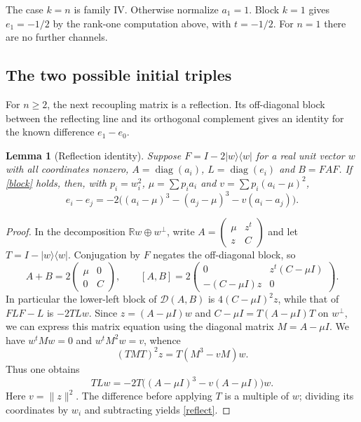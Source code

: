\documentclass[11pt]{article}
\newtheorem{lemma}[theorem]{Lemma}
\newcommand{\DD}{\mathcal D}
\newcommand{\pr}[1]{|#1\rangle\langle#1|}
\DeclareMathOperator{\diag}{diag}
\begin{document}
The case $k=n$ is family IV. Otherwise normalize $a_1=1$. Block $k=1$ gives $e_1=-1/2$ by the rank-one computation above, with $t=-1/2$. For $n=1$ there are no further channels.

\subsection{The two possible initial triples}
For $n\ge2$, the next recoupling matrix is a reflection. Its off-diagonal block between the reflecting line and its orthogonal complement gives an identity for the known difference $e_1-e_0$.

\begin{lemma}[Reflection identity]\label{reflection}
Suppose $F=I-2\pr{w}$ for a real unit vector $w$ with all coordinates nonzero, $A=\diag(a_i)$, $L=\diag(e_i)$ and $B=FAF$. If \eqref{block} holds, then, with $p_i=w_i^2$, $\mu=\sum p_i a_i$ and $v=\sum p_i(a_i-\mu)^2$,
\begin{equation}\label{reflect}
 e_i-e_j=-2\big((a_i-\mu)^3-(a_j-\mu)^3-v(a_i-a_j)\big).
\end{equation}
\end{lemma}
\begin{proof}
In the decomposition $\mathbb Rw\oplus w^\perp$, write $A=\left(\begin{smallmatrix}\mu&z^t\\z&C\end{smallmatrix}\right)$ and let $T=I-\pr{w}$. Conjugation by $F$ negates the off-diagonal block, so
\[
 A+B=2\begin{pmatrix}\mu&0\\0&C\end{pmatrix},\qquad
 [A,B]=2\begin{pmatrix}0&z^t(C-\mu I)\\-(C-\mu I)z&0\end{pmatrix}.
\]
In particular the lower-left block of $\DD(A,B)$ is $4(C-\mu I)^2z$, while that of $FLF-L$ is $-2TLw$. Since $z=(A-\mu I)w$ and $C-\mu I=T(A-\mu I)T$ on $w^\perp$, we can express this matrix equation using the diagonal matrix $M=A-\mu I$. We have $w^tMw=0$ and $w^tM^2w=v$, whence
\[
 (TMT)^2 z=T(M^3-vM)w.
\]
Thus one obtains
\[
 TLw=-2T\big((A-\mu I)^3-v(A-\mu I)\big)w.
\]
Here $v=\|z\|^2$. The difference before applying $T$ is a multiple of $w$; dividing its coordinates by $w_i$ and subtracting yields \eqref{reflect}.
\end{proof}
\end{document}
